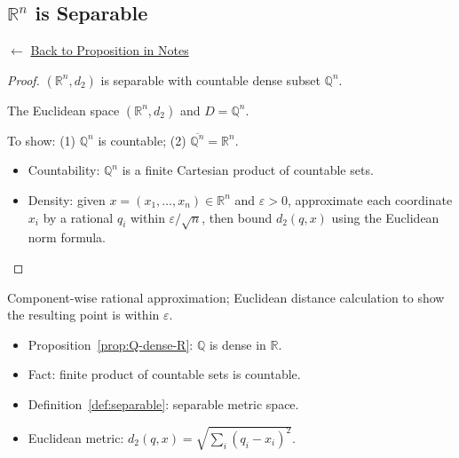 
\subsection*{$\mathbb{R}^n$ is Separable}
\label{prf:Rn-separable}

\begin{remark*}[Return]
$\leftarrow$ \hyperref[prop:Rn-separable]{Back to Proposition in Notes}
\end{remark*}

\begin{proof}
\Claim $(\mathbb{R}^n, d_2)$ is separable with countable dense subset $\mathbb{Q}^n$.

\Given The Euclidean space $(\mathbb{R}^n, d_2)$ and $D = \mathbb{Q}^n$.

\Goal To show: (1) $\mathbb{Q}^n$ is countable; (2) $\overline{\mathbb{Q}^n} = \mathbb{R}^n$.

\Strategy
\begin{itemize}
  \item Countability: $\mathbb{Q}^n$ is a finite Cartesian product of countable sets.
  \item Density: given $x = (x_1, \ldots, x_n) \in \mathbb{R}^n$ and $\varepsilon > 0$,
        approximate each coordinate $x_i$ by a rational $q_i$ within $\varepsilon/\sqrt{n}$,
        then bound $d_2(q, x)$ using the Euclidean norm formula.
\end{itemize}


\end{proof}

\begin{remark*}
Component-wise rational approximation; Euclidean distance calculation
to show the resulting point is within $\varepsilon$.
\end{remark*}

\begin{remark*}[Dependencies]
\begin{itemize}
  \item Proposition~\ref{prop:Q-dense-R}: $\mathbb{Q}$ is dense in $\mathbb{R}$.
  \item Fact: finite product of countable sets is countable.
  \item Definition~\ref{def:separable}: separable metric space.
  \item Euclidean metric: $d_2(q,x) = \sqrt{\sum_i (q_i - x_i)^2}$.
\end{itemize}
\end{remark*}
